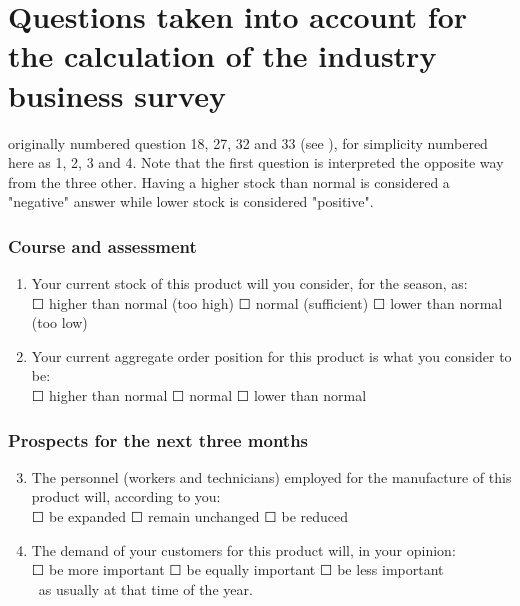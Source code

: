 \documentclass[12pt,a4paper,oneside]{book}
\begin{document}
\section*{Questions taken into account for the calculation of the industry business survey}
\label{Appendix: Question NS975 description}

originally numbered question 18, 27, 32 and 33 (see ), for simplicity numbered here as 1, 2, 3 and 4.
Note that the first question is interpreted the opposite way from the three other. Having a higher stock than normal is considered a "negative" answer while lower stock is considered "positive".


\subsubsection*{Course and assessment}
\begin{enumerate}
    \item Your current stock of this product will you consider, for the season, as: \\
	$\Square$ higher than normal (too high) $\Square$ normal (sufficient) $\Square$ lower than normal (too low)
	
    \item Your current aggregate order position for this product is what you consider to be: \\
	$\Square$ higher than normal $\Square$ normal $\Square$ lower than normal
\end{enumerate}

\subsubsection*{Prospects for the next three months} 
\begin{enumerate}
\setcounter{enumi}{2}
    \item The personnel (workers and technicians) employed for the manufacture of this product will, according to you: \\
	$\Square$ be expanded $\Square$ remain unchanged $\Square$ be reduced
						
    \item The demand of your customers for this product will, in your opinion:  \\
	$\Square$ be more important $\Square$ be equally important $\Square$ be less important \\\	
	as usually at that time of the year.
\end{enumerate}
\end{document}
